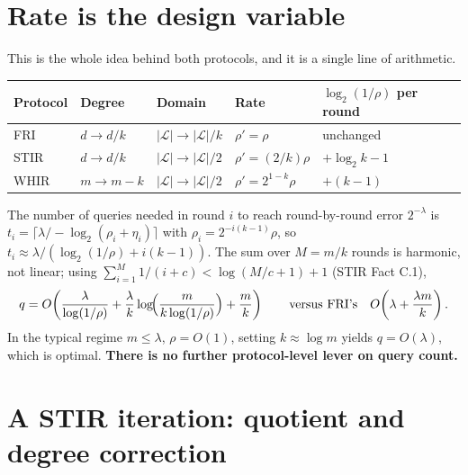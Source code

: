 \documentclass[11pt,a4paper]{article}
\begin{document}
\section{Rate is the design variable}

This is the whole idea behind both protocols, and it is a single line of arithmetic.

\begin{center}\small
\begin{tabular}{@{}lllll@{}}
\toprule
\textbf{Protocol} & \textbf{Degree} & \textbf{Domain} & \textbf{Rate} & $\log_{2}(1/\rho)$ per round\\
\midrule
FRI  & $d\to d/k$ & $|\mathcal{L}|\to|\mathcal{L}|/k$ & $\rho'=\rho$ & unchanged\\
STIR & $d\to d/k$ & $|\mathcal{L}|\to|\mathcal{L}|/2$ & $\rho'=(2/k)\rho$ & $+\log_{2}k-1$\\
WHIR & $m\to m-k$ & $|\mathcal{L}|\to|\mathcal{L}|/2$ & $\rho'=2^{1-k}\rho$ & $+(k-1)$\\
\bottomrule
\end{tabular}
\end{center}

\medskip
\noindent{}
\medskip

The number of queries needed in round $i$ to reach round-by-round error $2^{-\lambda}$ is
$t_{i}=\lceil \lambda / -\log_{2}(\rho_{i}+\eta_{i})\rceil$ with
$\rho_{i}=2^{-i(k-1)}\rho$, so $t_{i}\approx\lambda/(\log_{2}(1/\rho)+i(k-1))$. The sum over
$M=m/k$ rounds is harmonic, not linear; using $\sum_{i=1}^{M}1/(i+c)<\log(M/c+1)+1$ (STIR
Fact C.1),
\[
  q = O\!\left(\frac{\lambda}{\log(1/\rho)}
    + \frac{\lambda}{k}\log\!\Bigl(\frac{m}{k\log(1/\rho)}\Bigr)
    + \frac{m}{k}\right)
  \qquad\text{versus FRI's}\quad O\!\left(\lambda+\frac{\lambda m}{k}\right).
\]
In the typical regime $m\le\lambda$, $\rho=O(1)$, setting $k\approx\log m$ yields $q=O(\lambda)$,
which is optimal. \textbf{There is no further protocol-level lever on query count.}

\section{A STIR iteration: quotient and degree correction}
\end{document}

